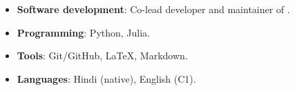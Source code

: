 \begin{itemize}[leftmargin=0.15in, label={}, itemsep=0pt]
  \item \textbf{Software development}: Co-lead developer and maintainer of .
  \item \textbf{Programming}: Python, Julia.
  \item \textbf{Tools}: Git/GitHub, LaTeX, Markdown.
  \item \textbf{Languages}: Hindi (native), English (C1).
\end{itemize}
